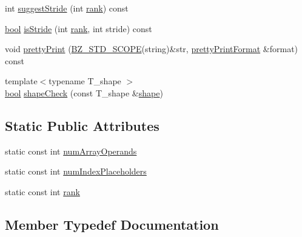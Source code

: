 \begin{DoxyCompactItemize}
\item 
int \hyperlink{class__bz__ArrayWhere_a2f2b3feedd7b95a4eb220b59db35f87f}{suggest\+Stride} (int \hyperlink{class__bz__ArrayWhere_ad72a01a0949053944abf6f1e4da15f67}{rank}) const 
\item 
\hyperlink{compiler_8h_abb452686968e48b67397da5f97445f5b}{bool} \hyperlink{class__bz__ArrayWhere_a704e2cee686cef707ed4bc0fafcf594c}{is\+Stride} (int \hyperlink{class__bz__ArrayWhere_ad72a01a0949053944abf6f1e4da15f67}{rank}, int stride) const 
\item 
void \hyperlink{class__bz__ArrayWhere_a90d6daab4f99297e0bef701c585876c1}{pretty\+Print} (\hyperlink{numinquire_8h_a2b24ffc3b4ef9803956bc7715c6c7b83}{B\+Z\+\_\+\+S\+T\+D\+\_\+\+S\+C\+O\+P\+E}(string)\&str, \hyperlink{classprettyPrintFormat}{pretty\+Print\+Format} \&format) const 
\item 
{\footnotesize template$<$typename T\+\_\+shape $>$ }\\\hyperlink{compiler_8h_abb452686968e48b67397da5f97445f5b}{bool} \hyperlink{class__bz__ArrayWhere_aab0e89b0993f764157f7e6f44e5c6552}{shape\+Check} (const T\+\_\+shape \&\hyperlink{shape_8h_a9d9da3dcaecbbde6cf1961063f2e838b}{shape})
\end{DoxyCompactItemize}
\subsection*{Static Public Attributes}
\begin{DoxyCompactItemize}
\item 
static const int \hyperlink{class__bz__ArrayWhere_a546563f5dbe57bedb88149d3125feb6f}{num\+Array\+Operands}
\item 
static const int \hyperlink{class__bz__ArrayWhere_ab1e37cbc576023cb9ff10dcf7a2412eb}{num\+Index\+Placeholders}
\item 
static const int \hyperlink{class__bz__ArrayWhere_ad72a01a0949053944abf6f1e4da15f67}{rank}
\end{DoxyCompactItemize}


\subsection{Member Typedef Documentation}
\hypertarget{class__bz__ArrayWhere_a32c58caf104cc6fe6f26de21ebacf028}{}

